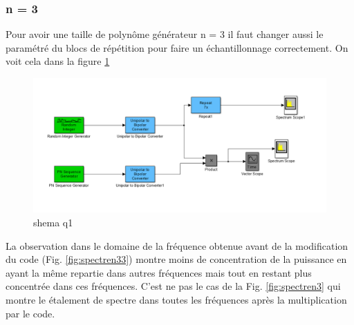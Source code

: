 \documentclass{report}
\begin{document}
\subsubsection{n = 3}
Pour avoir une taille de polynôme générateur n = 3 il faut changer aussi le paramétré du blocs de répétition pour
faire un échantillonnage correctement. On voit cela dans la figure \ref{fig:schemaq1_solo_7}
\begin{figure}[h]
	\centering
	\includegraphics[width=0.6\linewidth]{schema_q1_solo}
	\caption{shema q1}
	\label{fig:schemaq1_solo_7}
\end{figure}
La observation dans le domaine de la fréquence obtenue avant de la modification du code (Fig. \ref{fig:spectren33}) 
montre moins de concentration de la puissance en ayant la même repartie dans autres fréquences mais tout en restant
plus concentrée dans ces fréquences. C'est ne pas le cas de la Fig. \ref{fig:spectren3} qui montre le étalement de spectre dans toutes les fréquences après la multiplication par le code.

%
\end{document}

